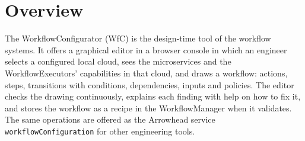 \documentclass[a4paper]{arrowhead}
\begin{document}

\ArrowheadSetup

\begin{center}
  \vspace*{1cm}
  \huge{\arrowtitle}

  \vspace*{0.2cm}
  \LARGE{\arrowtype}
  \vspace*{1cm}

  
  \vspace*{\fill}

  

  \vspace*{1cm}
  \vspace*{\fill}

  \begin{abstract}
    This document describes the WorkflowConfigurator, an Eclipse Arrowhead support system that lets an engineer draw workflows with conditions between the microservices of configured local clouds, and validates and stores them in the WorkflowManager. Documentation edition 5.4.0; system version 5.4.0 (framework), service versions 1.0.0.
  \end{abstract}

  \vspace*{1cm}
\end{center}

\newpage

\tableofcontents
\newpage

\section{Overview}
\label{sec:overview}
The WorkflowConfigurator (WfC) is the design-time tool of the workflow systems. It offers a graphical
editor in a browser console in which an engineer selects a configured local cloud, sees the microservices and the
WorkflowExecutors' capabilities in that cloud, and draws a workflow: actions, steps, transitions with conditions,
dependencies, inputs and policies. The editor checks the drawing continuously, explains each finding with help on how
to fix it, and stores the workflow as a recipe in the WorkflowManager when it validates. The same operations are
offered as the Arrowhead service \texttt{workflow\allowbreak{}Configuration} for other engineering tools.
\end{document}
